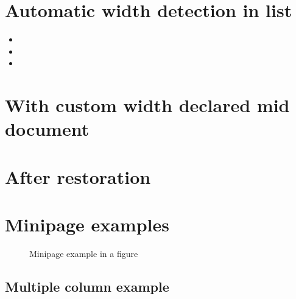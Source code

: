 \documentclass{article}
\begin{document}
\section{Automatic width detection in list}

\lipsum[1][1-3]
\notebox{\lipsum[1][4-6]}
\lipsum[1][7-9]

\begin{itemize}
\item \lipsum[2][1-3]
\item \lipsum[2][4-5]\notebox{\lipsum[2][6-7]}
\item \lipsum[2][8-9]
\end{itemize}

\lipsum[3][1-3]
\notebox{\lipsum[3][4-6]}
\lipsum[3][7-9]

\section{With custom width declared mid document}

\setlength{\aweboxcontentwidth}{0.45\linewidth}

\lipsum[4][1-3]
\notebox{\lipsum[4][4-6]}
\lipsum[4][7-9]

\section{After restoration}

\setlength{\aweboxcontentwidth}{0.88\linewidth}

\lipsum[5][1-3]
\notebox{\lipsum[5][4-6]}
\lipsum[5][7-9]

\section{Minipage examples}


\begin{figure}[h!]
  \centering
  \caption{Minipage example in a figure}
  \label{fig:minipageex}
\end{figure}

\clearpage

\begin{multicols}{2}
  \section{Multiple column example}
  \lipsum[1]

  \notebox{\lipsum[2][1-3]}

  \lipsum[3-7]
\end{multicols}
\end{document}
